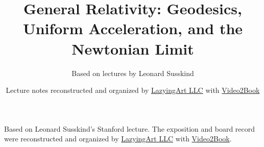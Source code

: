 \documentclass[11pt,oneside]{book}
\begin{document}
\frontmatter
\title{General Relativity: Geodesics, Uniform Acceleration, and the Newtonian Limit}
\author{Based on lectures by Leonard Susskind}
\date{Lecture notes reconstructed and organized by \href{https://lazying.art}{LazyingArt LLC} with \href{https://github.com/lachlanchen/Video2Book}{Video2Book}}
\maketitle
\begin{center}
\small Based on Leonard Susskind's Stanford lecture. The exposition and board record were reconstructed and organized by \href{https://lazying.art}{LazyingArt LLC} with \href{https://github.com/lachlanchen/Video2Book}{Video2Book}.
\end{center}
\clearpage
\mainmatter

\end{document}
